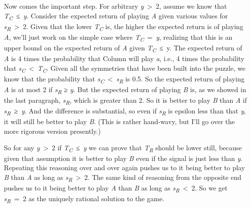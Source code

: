 \documentclass[
  10pt,
  letterpaper,
  twoside]{scrbook}
\begin{document}
Now comes the important step. For arbitrary \emph{y}~\textgreater~2,
assume we know that \emph{T\textsubscript{C}}~≤~\emph{y}. Consider the
expected return of playing \emph{A} given various values for
\emph{s\textsubscript{R}}~\textgreater~2. Given that the lower
\emph{T\textsubscript{C}} is, the higher the expected return is of
playing \emph{A}, we'll just work on the simple case where
\emph{T\textsubscript{C}}~=~\emph{y}, realizing that this is an upper
bound on the expected return of \emph{A} given
\emph{T\textsubscript{C}}~≤~y. The expected return of \emph{A} is 4
times the probability that Column will play \emph{a}, i.e., 4 times the
probability that
\emph{s\textsubscript{C}}~\textless~\emph{T\textsubscript{C}}. Given all
the symmetries that have been built into the puzzle, we know that the
probability that
\emph{s\textsubscript{C}}~\textless~\emph{s\textsubscript{R}} is 0.5. So
the expected return of playing \emph{A} is at most 2 if
\emph{s\textsubscript{R}} ≥ \emph{y}. But the expected return of playing
\emph{B} is, as we showed in the last paragraph,
\emph{s\textsubscript{R}}, which is greater than 2. So it is better to
play \emph{B} than \emph{A} if \emph{s\textsubscript{R}}~≥~\emph{y}. And
the difference is substantial, so even if \emph{s\textsubscript{R}} is
epsilon less than that \emph{y}, it will still be better to play
\emph{B}. (This is rather hand-wavy, but I'll go over the more rigorous
version presently.)

So for any \emph{y}~\textgreater~2 if
\emph{T\textsubscript{C}}~≤~\emph{y} we can prove that
\emph{T\textsubscript{R}} should be lower still, because given that
assumption it is better to play \emph{B} even if the signal is just less
than \emph{y}. Repeating this reasoning over and over again pushes us to
it being better to play \emph{B} than \emph{A} as long as
\emph{s\textsubscript{R}}~\textgreater~2. The same kind of reasoning
from the opposite end pushes us to it being better to play \emph{A} than
\emph{B} as long as \emph{s\textsubscript{R}}~\textless~2. So we get
\emph{s\textsubscript{R}}~=~2 as the uniquely rational solution to the
game.
\end{document}
